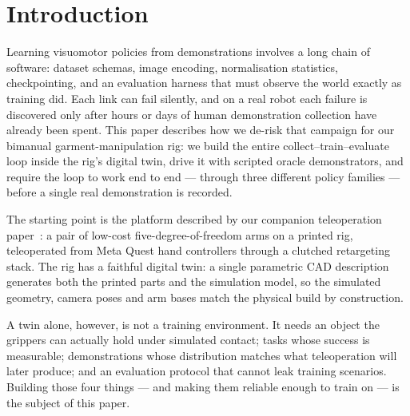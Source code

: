 \section{Introduction}
\label{sec:intro}

Learning visuomotor policies from demonstrations involves a long chain
of software: dataset schemas, image encoding, normalisation statistics,
checkpointing, and an evaluation harness that must observe the world
exactly as training did. Each link can fail silently, and on a real
robot each failure is discovered only after hours or days of human
demonstration collection have already been spent. This paper describes
how we de-risk that campaign for our bimanual garment-manipulation rig:
we build the entire collect--train--evaluate loop inside the rig's
digital twin, drive it with scripted oracle demonstrators, and require
the loop to work end to end --- through three different policy families
--- before a single real demonstration is recorded.

The starting point is the platform described by our companion
teleoperation paper~\citep{so101teleop}: a pair of low-cost
five-degree-of-freedom arms on a printed rig, teleoperated from Meta
Quest hand controllers through a clutched retargeting stack. The rig has
a faithful digital twin: a single parametric CAD description generates
both the printed parts and the simulation model, so the simulated
geometry, camera poses and arm bases match the physical build by
construction.

A twin alone, however, is not a training environment. It needs an object
the grippers can actually hold under simulated contact; tasks whose
success is measurable; demonstrations whose distribution matches what
teleoperation will later produce; and an evaluation protocol that cannot
leak training scenarios. Building those four things --- and making them
reliable enough to train on --- is the subject of this paper.

